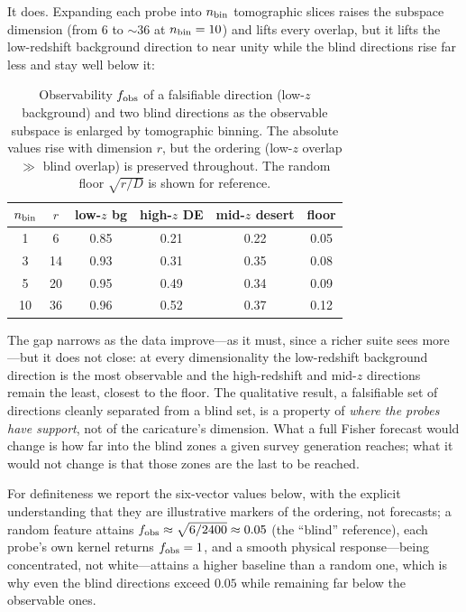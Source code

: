 \documentclass[twocolumn,10pt]{article}
\newcommand{\obs}{f_{\rm obs}}
\begin{document}
It does. Expanding each probe into $n_{\rm bin}$ tomographic slices raises the
subspace dimension (from $6$ to $\sim36$ at $n_{\rm bin}=10$) and lifts every
overlap, but it lifts the low-redshift background direction to near unity while
the blind directions rise far less and stay well below it:
\begin{table}[t]
\caption{Observability $\obs$ of a falsifiable direction (low-$z$ background)
and two blind directions as the observable subspace is enlarged by tomographic
binning. The absolute values rise with dimension $r$, but the ordering
(low-$z$ overlap $\gg$ blind overlap) is preserved throughout. The random
floor $\sqrt{r/D}$ is shown for reference.}
\label{tab:tomography}
\begin{center}\small
\begin{tabular}{cccccc}
\hline\hline
$n_{\rm bin}$ & $r$ & low-$z$ bg & high-$z$ DE & mid-$z$ desert & floor \\ \hline
1  & 6  & 0.85 & 0.21 & 0.22 & 0.05 \\
3  & 14 & 0.93 & 0.31 & 0.35 & 0.08 \\
5  & 20 & 0.95 & 0.49 & 0.34 & 0.09 \\
10 & 36 & 0.96 & 0.52 & 0.37 & 0.12 \\
\hline\hline
\end{tabular}
\end{center}
\end{table}
The gap narrows as the data improve---as it must, since a richer suite sees
more---but it does not close: at every dimensionality the low-redshift
background direction is the most observable and the high-redshift and mid-$z$
directions remain the least, closest to the floor. The qualitative result, a
falsifiable set of directions cleanly separated from a blind set, is a property
of \emph{where the probes have support}, not of the caricature's dimension. What
a full Fisher forecast would change is how far into the blind zones a given
survey generation reaches; what it would not change is that those zones are the
last to be reached.

For definiteness we report the six-vector values below, with the explicit
understanding that they are illustrative markers of the ordering, not forecasts;
a random feature attains $\obs\approx\sqrt{6/2400}\approx0.05$ (the ``blind''
reference), each probe's own kernel returns $\obs=1$, and a smooth physical
response---being concentrated, not white---attains a higher baseline than a
random one, which is why even the blind directions exceed $0.05$ while remaining
far below the observable ones.
\end{document}
